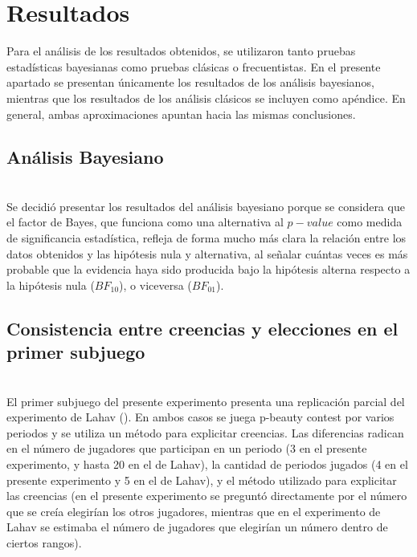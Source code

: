 \chapter{Resultados} %
\label{Cap_Res} %

Para el análisis de los resultados obtenidos, se utilizaron tanto pruebas estadísticas bayesianas como pruebas clásicas o frecuentistas. En el presente apartado se presentan únicamente los resultados de los análisis bayesianos, mientras que los resultados de los análisis clásicos se incluyen como apéndice. En general, ambas aproximaciones apuntan hacia las mismas conclusiones.\\

\section{Análisis Bayesiano}\\

Se decidió presentar los resultados del análisis bayesiano porque se considera que el factor de Bayes, que funciona como una alternativa al $p-value$ como medida de significancia estadística, refleja de forma mucho más clara la  relación entre los datos obtenidos y las hipótesis nula y alternativa, al señalar cuántas veces es más probable que la evidencia haya sido producida bajo la hipótesis alterna respecto a la hipótesis nula ($BF_10$), o viceversa ($BF_01$).\\

\section{Consistencia entre creencias y elecciones en el primer subjuego}\\

El primer subjuego del presente experimento presenta una replicación parcial del experimento de Lahav (\citeyear{Lahav}). En ambos casos se juega p-beauty contest por varios periodos y se utiliza un método para explicitar creencias. Las diferencias radican en el número de jugadores que participan en un periodo (3 en el presente experimento, y hasta 20 en el de Lahav), la cantidad de periodos jugados (4 en el presente experimento y 5 en el de Lahav), y el método utilizado para explicitar las creencias (en el presente experimento se preguntó directamente por el número que se creía elegirían los otros jugadores, mientras que en el experimento de Lahav se estimaba el número de jugadores que elegirían un número dentro de ciertos rangos).\\

